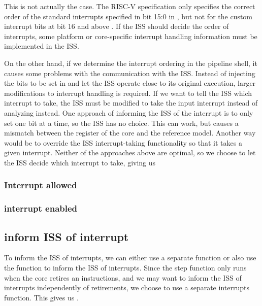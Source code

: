 This is not actually the case. The RISC-V specification only specifies the correct order of the standard interrupts specified in bit 15:0 in , but not for the custom interrupt bits at bit 16 and above \cite{watermanRISCVInstructionSet2021}. If the ISS should decide the order of interrupts, some platform or core-specific interrupt handling information must be implemented in the ISS.

On the other hand, if we determine the interrupt ordering in the pipeline shell, it causes some problems with the communication with the ISS. Instead of injecting the bits to be set in  and let the ISS operate close to its original execution, larger modifications to interrupt handling is required. If we want to tell the ISS which interrupt to take, the ISS must be modified to take the input interrupt instead of analyzing  instead. One approach of informing the ISS of the interrupt is to only set one  bit at a time, so the ISS has no choice. This can work, but causes a mismatch between the  register of the core and the reference model. Another way would be to override the ISS interrupt-taking functionality so that it takes a given interrupt.
Neither of the approaches above are optimal, so we choose to let the ISS decide which interrupt to take, giving us \textbf{}



\subsubsection{Interrupt allowed}


\subsubsection{interrupt enabled}


\subsection{inform ISS of interrupt}

To inform the ISS of interrupts, we can either use a separate  function or also use the  function to inform the ISS of interrupts.
Since the step function only runs when the core retires an instructions, and we may want to inform the ISS of interrupts independently of retirements, we choose to use a separate interrupts function. This gives us \textbf{}.

